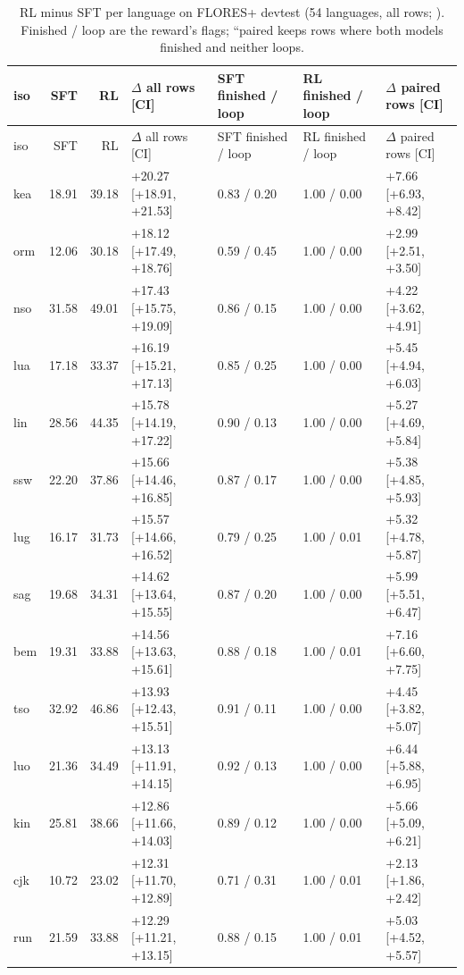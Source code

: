 {\scriptsize
\setlength{\tabcolsep}{4pt}
\begin{longtable}{@{}lrrllll@{}}
\caption{RL minus SFT per language on FLORES+ devtest (54 languages, all rows; \chrfpp{}). Finished / loop are the reward's flags; ``paired keeps rows where both models finished and neither loops.}\label{tab:perlang_flores}\\
\toprule
iso & SFT & RL & $\Delta$ all rows [CI] & SFT finished / loop & RL finished / loop & $\Delta$ paired rows [CI] \\
\midrule\endfirsthead
\toprule
iso & SFT & RL & $\Delta$ all rows [CI] & SFT finished / loop & RL finished / loop & $\Delta$ paired rows [CI] \\
\midrule\endhead
\bottomrule\endlastfoot
kea & 18.91 & 39.18 & +20.27 [+18.91, +21.53] & 0.83 / 0.20 & 1.00 / 0.00 & +7.66 [+6.93, +8.42] \\
orm & 12.06 & 30.18 & +18.12 [+17.49, +18.76] & 0.59 / 0.45 & 1.00 / 0.00 & +2.99 [+2.51, +3.50] \\
nso & 31.58 & 49.01 & +17.43 [+15.75, +19.09] & 0.86 / 0.15 & 1.00 / 0.00 & +4.22 [+3.62, +4.91] \\
lua & 17.18 & 33.37 & +16.19 [+15.21, +17.13] & 0.85 / 0.25 & 1.00 / 0.00 & +5.45 [+4.94, +6.03] \\
lin & 28.56 & 44.35 & +15.78 [+14.19, +17.22] & 0.90 / 0.13 & 1.00 / 0.00 & +5.27 [+4.69, +5.84] \\
ssw & 22.20 & 37.86 & +15.66 [+14.46, +16.85] & 0.87 / 0.17 & 1.00 / 0.00 & +5.38 [+4.85, +5.93] \\
lug & 16.17 & 31.73 & +15.57 [+14.66, +16.52] & 0.79 / 0.25 & 1.00 / 0.01 & +5.32 [+4.78, +5.87] \\
sag & 19.68 & 34.31 & +14.62 [+13.64, +15.55] & 0.87 / 0.20 & 1.00 / 0.00 & +5.99 [+5.51, +6.47] \\
bem & 19.31 & 33.88 & +14.56 [+13.63, +15.61] & 0.88 / 0.18 & 1.00 / 0.01 & +7.16 [+6.60, +7.75] \\
tso & 32.92 & 46.86 & +13.93 [+12.43, +15.51] & 0.91 / 0.11 & 1.00 / 0.00 & +4.45 [+3.82, +5.07] \\
luo & 21.36 & 34.49 & +13.13 [+11.91, +14.15] & 0.92 / 0.13 & 1.00 / 0.00 & +6.44 [+5.88, +6.95] \\
kin & 25.81 & 38.66 & +12.86 [+11.66, +14.03] & 0.89 / 0.12 & 1.00 / 0.00 & +5.66 [+5.09, +6.21] \\
cjk & 10.72 & 23.02 & +12.31 [+11.70, +12.89] & 0.71 / 0.31 & 1.00 / 0.01 & +2.13 [+1.86, +2.42] \\
run & 21.59 & 33.88 & +12.29 [+11.21, +13.15] & 0.88 / 0.15 & 1.00 / 0.01 & +5.03 [+4.52, +5.57] \\

\end{longtable}}
